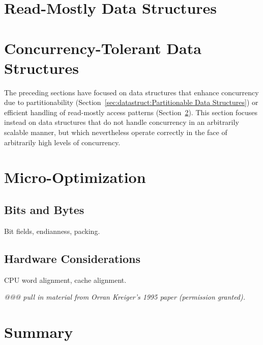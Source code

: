 \section{Read-Mostly Data Structures}
\label{sec:datastruct:Read-Mostly Data Structures}

\section{Concurrency-Tolerant Data Structures}
\label{sec:datastruct:Concurrency-Tolerant Data Structures}

The preceding sections have focused on data structures that enhance
concurrency due to partitionability
(Section~\ref{sec:datastruct:Partitionable Data Structures})
or efficient handling of read-mostly access patterns
(Section~\ref{sec:datastruct:Concurrency-Tolerant Data Structures}).
This section focuses instead on data structures that do not
handle concurrency in an arbitrarily scalable manner, but which
nevertheless operate correctly in the face of arbitrarily high
levels of concurrency.

\section{Micro-Optimization}
\label{sec:datastruct:Micro-Optimization}

\subsection{Bits and Bytes}
\label{sec:datastruct:Bits and Bytes}

Bit fields, endianness, packing.

\subsection{Hardware Considerations}
\label{sec:datastruct:Hardware Considerations}

CPU word alignment, cache alignment.

\emph{@@@ pull in material from Orran Kreiger's 1995 paper (permission
granted).}

\section{Summary}
\label{sec:datastruct:Summary}


